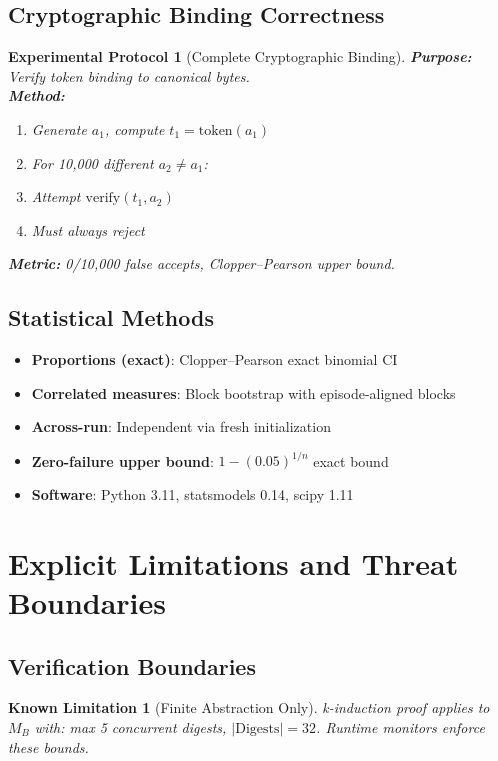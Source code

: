 \documentclass[12pt]{article}
\newtheorem{protocol}{Experimental Protocol}[section]
\newtheorem{limitation}{Known Limitation}[section]
\begin{document}
\subsection{Cryptographic Binding Correctness}

\begin{protocol}[Complete Cryptographic Binding]
\textbf{Purpose:} Verify token binding to canonical bytes.\\
\textbf{Method:}
\begin{enumerate}
    \item Generate $a_1$, compute $t_1 = \mathrm{token}(a_1)$
    \item For 10,000 different $a_2 \neq a_1$:
    \item Attempt $\mathrm{verify}(t_1, a_2)$
    \item Must always reject
\end{enumerate}
\textbf{Metric:} 0/10,000 false accepts, Clopper--Pearson upper bound.
\end{protocol}

\subsection{Statistical Methods}

\begin{itemize}
    \item \textbf{Proportions (exact)}: Clopper--Pearson exact binomial CI
    \item \textbf{Correlated measures}: Block bootstrap with episode-aligned blocks
    \item \textbf{Across-run}: Independent via fresh initialization
    \item \textbf{Zero-failure upper bound}: $1 - (0.05)^{1/n}$ exact bound
    \item \textbf{Software}: Python 3.11, statsmodels 0.14, scipy 1.11
\end{itemize}

\section{Explicit Limitations and Threat Boundaries}

\subsection{Verification Boundaries}

\begin{limitation}[Finite Abstraction Only]
k-induction proof applies to $M_B$ with: max 5 concurrent digests, $|\mathrm{Digests}|=32$. Runtime monitors enforce these bounds.
\end{limitation}
\end{document}
